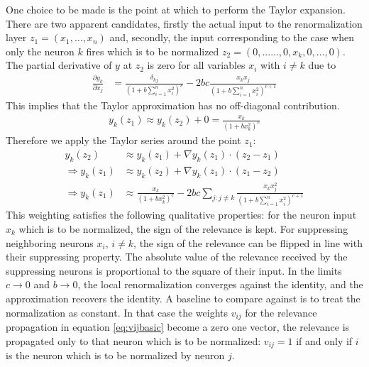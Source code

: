 \documentclass[runningheads,a4paper]{llncs}
\begin{document}
One choice to be made is the point at which to perform the Taylor expansion. There are two apparent candidates, firstly the actual input to the renormalization layer 
$z_1=(x_1, \ldots, x_n)$ and, secondly, the input corresponding to the case when only the neuron $k$ fires which is to be normalized 
$z_2=(0, ... \ldots,0, x_k, 0, \ldots, 0)$. The partial derivative of $y$ at $z_2$ is zero for all variables $x_i$ with $i \neq k$ due to 
\begin{align}
\frac{\partial y_k}{\partial x_j}& =  \frac{\delta_{kj}}{  \left(1+ b \sum_{i=1}^n x_i^2 \right)^{c}  }-2bc\frac{x_k x_j}{  \left(1+ b \sum_{i=1}^n x_i^2 \right)^{c+1}  } 
\end{align}
This implies that the Taylor approximation has no off-diagonal contribution.
\begin{align}
 y_k(z_1) \approx y_k(z_2)+0=\frac{x_k}{(1+bx_k^2)^c} \label{eq:baseline2}
\end{align}
Therefore we apply the Taylor series around the point $z_1$:
\begin{align}
y_k(z_2) &\approx y_k(z_1) +\nabla y_k(z_1) \cdot (z_2-z_1)\\
\Rightarrow  y_k(z_1) &\approx y_k(z_2)  +\nabla y_k(z_1) \cdot (z_1-z_2) \\
\Rightarrow  y_k(z_1) &\approx \frac{x_k}{(1+bx_k^2)^c}-2bc \sum_{j:j \neq k} \frac{x_k x_j^2}{  \left(1+ b \sum_{i=1}^n x_i^2 \right)^{c+1}  } \label{eq:taylor_lrn_firstorder}
\end{align}
This weighting satisfies the following qualitative properties: for the neuron input $x_k$ which is to be normalized, the sign of the relevance is kept. For suppressing neighboring neurons $x_i$, $i \neq k$, the sign of the relevance can be flipped in line with their suppressing property. The absolute value of the relevance received by the suppressing neurons is proportional to the square of their input. In the limits $c \rightarrow 0$ and $b \rightarrow 0$, the local renormalization converges against the identity, and the approximation recovers the identity. 
A baseline to compare against is to treat the normalization as constant. In that case the weights $v_{ij}$ for the relevance propagation in equation \ref{eq:vijbasic} become a zero one vector, the relevance is propagated only to that neuron which is to be normalized: $v_{ij}=1$ if and only if $i$ is the neuron which is to be normalized by neuron $j$.

\end{document}
